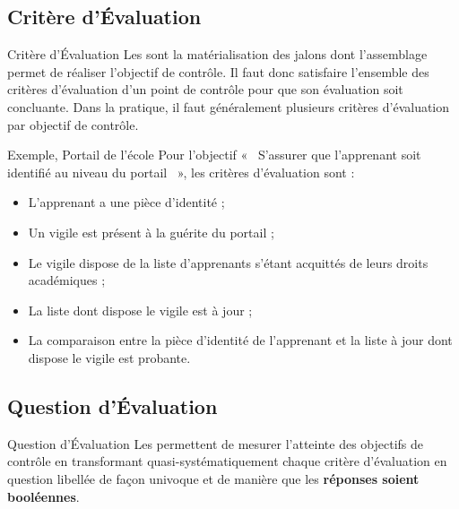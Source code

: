 \subsection{Critère d'Évaluation}

\begin{boxdef}{Critère d'Évaluation}
Les  sont la matérialisation des jalons dont
l'assemblage permet de réaliser l'objectif de contrôle. Il faut donc satisfaire
l'ensemble des critères d'évaluation d'un point de contrôle pour que son évaluation
soit concluante. Dans la pratique, il faut généralement plusieurs critères d'évaluation
par objectif de contrôle.
\end{boxdef}

\begin{boxlizbiz}{Exemple, Portail de l'école}
Pour l'objectif «~ S'assurer que l'apprenant soit identifié au niveau du portail ~»{},
les critères d'évaluation sont :
\begin{itemize}
  \item L'apprenant a une pièce d'identité ;
  \item Un vigile est présent à la guérite du portail ;
  \item Le vigile dispose de la liste d'apprenants s'étant acquittés de leurs droits
    académiques ;
  \item La liste dont dispose le vigile est à jour ;
  \item La comparaison entre la pièce d'identité de l'apprenant et la liste à jour dont
    dispose le vigile est probante.
\end{itemize}
\end{boxlizbiz}

\subsection{Question d'Évaluation}

\begin{boxdef}{Question d'Évaluation}
Les  permettent de mesurer l'atteinte des objectifs
de contrôle en transformant quasi-systématiquement chaque critère d'évaluation en
question libellée de façon univoque et de manière que les \textbf{réponses soient
booléennes}.
\end{boxdef}

